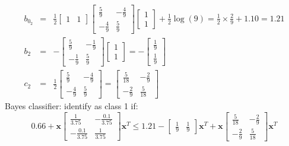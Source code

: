 \documentclass{article}
\begin{document}
\begin{itemize}
\begin{eqnarray*}
b_{0_2} & = & \frac{1}{2} \begin{bmatrix}
1 & 1
\end{bmatrix} \begin{bmatrix}
\frac{5}{9} & -\frac{4}{9} \\
-\frac{4}{9} & \frac{5}{9}
\end{bmatrix} 
\begin{bmatrix}
1 \\
1
\end{bmatrix}+ \frac{1}{2} \log(9) = \frac{1}{2} \times \frac{2}{9} + 1.10 = 1.21 \\
b_2 & = & -\begin{bmatrix}
\frac{5}{9} & -\frac{1}{9} \\
-\frac{1}{9} & \frac{5}{9}
\end{bmatrix} \begin{bmatrix}
1 \\ 1
\end{bmatrix} = - \begin{bmatrix}
\frac{1}{9} \\ \frac{1}{9}
\end{bmatrix} \\
c_2 & = & \frac{1}{2} \begin{bmatrix}
\frac{5}{9} & -\frac{4}{9} \\
-\frac{4}{9} & \frac{5}{9}
\end{bmatrix} = \begin{bmatrix}
\frac{5}{18} & -\frac{2}{9} \\
-\frac{2}{9} & \frac{5}{18}
\end{bmatrix}
\end{eqnarray*}
Bayes classifier: identify as class 1 if:
\begin{equation*}
0.66 + \mathbf{x} \begin{bmatrix}
\frac{1}{3.75} & -\frac{0.1}{3.75} \\
-\frac{0.1}{3.75} & \frac{1}{3.75}
\end{bmatrix}\mathbf{x}^T \le 1.21  -\begin{bmatrix}
\frac{1}{9} & \frac{1}{9}
\end{bmatrix} \mathbf{x}^T + \mathbf{x}  \begin{bmatrix}
\frac{5}{18} & -\frac{2}{9} \\
-\frac{2}{9} & \frac{5}{18}
\end{bmatrix} \mathbf{x}^T
\end{equation*}


\end{itemize}
\end{document}
